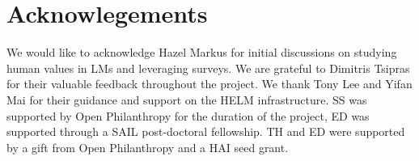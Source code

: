 \section*{Acknowlegements}
We would like to acknowledge Hazel Markus for initial discussions on studying human values in LMs and leveraging surveys.
We are grateful to Dimitris Tsipras for their valuable feedback throughout the project.
We thank Tony Lee and Yifan Mai for their guidance and support on the HELM infrastructure.
SS was supported by Open Philanthropy for the duration of the project, ED was supported through a SAIL post-doctoral fellowship.
TH and ED were supported by a gift from Open Philanthropy and a HAI seed grant. 